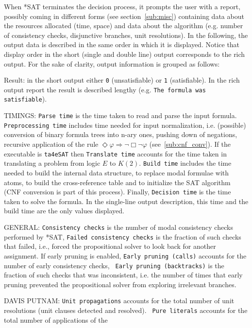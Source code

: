 \documentclass[12pt]{report}
\begin{document}
When *SAT terminates the decision process, it prompts the user with
a report, possibly coming in different forms (see
section~\ref{sub:misc}) containing data about the resources allocated
(time, space) and data about the algorithm (e.g. number of consistency checks,
disjunctive branches, unit resolutions).
In the following, the output data is described in the same order in
which it is displayed. Notice
that display order in the short (single and double line) 
output corresponds to the rich output.
For the sake of clarity, output information is grouped as follows:
\begin{description}
\item{Result:} in the short output either {\tt 0} (unsatisfiable) or
{\tt 1} (satisfiable). In the rich output report the result is
described lengthy
(e.g. {\tt The formula was satisfiable}).
\item{TIMINGS:} {\tt Parse
time} is the time taken to read and parse the input formula. {\tt
Preprocessing time} includes time needed for input normalization,
i.e. (possible) conversion of binary formula trees into n-ary ones,
pushing down of negations, recursive application of the rule 
$\Diamond \varphi  \Rightarrow \neg \Box \neg \varphi$
(see~\ref{sub:cnf_conv}). If the executable is
{\tt ta4eSAT} then {\tt Translate time} accounts for the time taken in
translating a problem from logic $E$ to $K(2)$. {\tt Build time} includes
the time needed to build the internal data structure, to 
replace modal formulae with atoms, to build the cross-reference
table and to initialize the SAT algorithm (CNF conversion is part
of this process). Finally, {\tt Decision time} is the time taken to
solve the formula. In the single-line output description, this time
and the build time are the only values displayed. 
\item{GENERAL:} {\tt Consistency checks} is the number of modal
consistency checks performed by *SAT, {\tt Failed consistency checks}
is the fraction of such checks that failed, i.e., forced the
propositional solver to look back for another assignment. If early pruning
is enabled, {\tt Early pruning (calls)} accounts for the
number of early consistency checks, {\tt
Early pruning (backtracks)} is the fraction of such checks that was
inconsistent, i.e. the number of times that early pruning 
prevented the propositional solver from exploring
irrelevant branches.
\item{DAVIS PUTNAM:} {\tt Unit propagations} accounts for the total
number of unit resolutions (unit clauses detected and resolved). {\tt
Pure literals} accounts for the total number of applications of the

\end{description}
\end{document}
